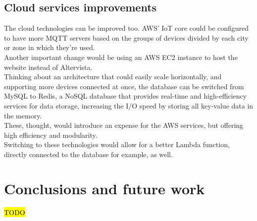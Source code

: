 \documentclass[conference]{IEEEtran}
\DeclareRobustCommand{\hlcyan}[1]{{\sethlcolor{cyan}\hl{#1}}}
\begin{document}
	\subsection{Cloud services improvements}
		The cloud technologies can be improved too.
		AWS' IoT core could be configured to have more MQTT servers based on the groups of devices divided by each city or zone in which they're used.\\
		Another important change would be using an AWS EC2 instance to host the website instead of Altervista.\\
		Thinking about an architecture that could easily scale horizontally, and supporting more devices connected at once, the database can be switched from MySQL to Redis,  a NoSQL database that provides real-time and high-efficiency services for data storage, increasing the I/O speed by storing all key-value data in the memory\cite{redis}.\\
		These, thought, would introduce an expense for the AWS services, but offering high efficiency and modularity.\\
		Switching to these technologies would allow for a better Lambda function, directly connected to the database for example, as well.
		
\section{Conclusions and future work}\label{conclusions}

	\hlcyan{TODO}

%
\end{document}
